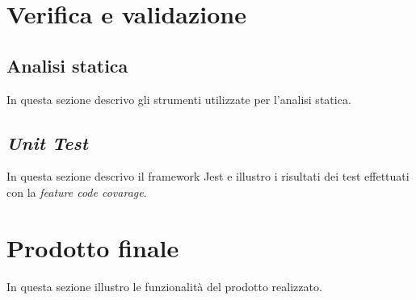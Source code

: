 \section{Verifica e validazione}

\subsection{Analisi statica}
In questa sezione descrivo gli strumenti utilizzate per l'analisi statica.

\subsection{\emph{Unit Test}}
In questa sezione descrivo il framework Jest e illustro i risultati dei test effettuati con la \emph{feature code covarage}.

\section{Prodotto finale}
In questa sezione illustro le funzionalità del prodotto realizzato.